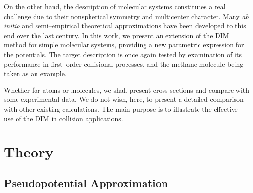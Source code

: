 \documentclass[10pt]{article}
\begin{document}
On the other hand, the description of molecular systems constitutes 
a real challenge due to their nonspherical symmetry and multicenter 
character. Many \textit{ab initio} and semi--empirical theoretical 
approximations \cite{Szabo1996,Helgaker2000,Schaefer2004} have been 
developed to this end over the last century. In this work, we present 
an extension of the DIM method for simple molecular systems, 
providing a new parametric expression for the potentials. The target 
description is once again tested by examination of its performance in 
first--order collisional processes, and the methane molecule being 
taken as an example.

Whether for atoms or molecules, we shall present cross sections and 
compare with some experimental data. We do not wish, here, to present 
a detailed comparison with other existing calculations. The main 
purpose is to illustrate the effective use of the DIM in collision 
applications.

\section{Theory}

\subsection{Pseudopotential Approximation}
\label{sec:PPAs}
\end{document}

